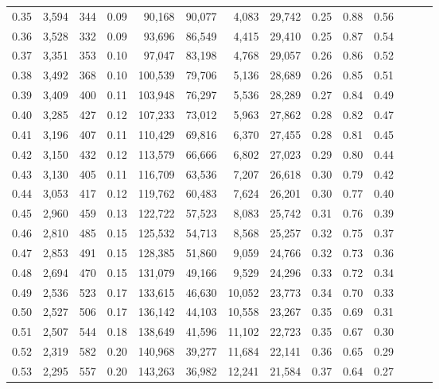 \begin{tabular}{rrrrrrrrrrrrrr}
0.35 &  3,594 &  344 &  0.09 &   90,168 &   90,077 &   4,083 &  29,742 &  0.25 &  0.88 &      0.56 \\
0.36 &  3,528 &  332 &  0.09 &   93,696 &   86,549 &   4,415 &  29,410 &  0.25 &  0.87 &      0.54 \\
0.37 &  3,351 &  353 &  0.10 &   97,047 &   83,198 &   4,768 &  29,057 &  0.26 &  0.86 &      0.52 \\
0.38 &  3,492 &  368 &  0.10 &  100,539 &   79,706 &   5,136 &  28,689 &  0.26 &  0.85 &      0.51 \\
0.39 &  3,409 &  400 &  0.11 &  103,948 &   76,297 &   5,536 &  28,289 &  0.27 &  0.84 &      0.49 \\
0.40 &  3,285 &  427 &  0.12 &  107,233 &   73,012 &   5,963 &  27,862 &  0.28 &  0.82 &      0.47 \\
0.41 &  3,196 &  407 &  0.11 &  110,429 &   69,816 &   6,370 &  27,455 &  0.28 &  0.81 &      0.45 \\
0.42 &  3,150 &  432 &  0.12 &  113,579 &   66,666 &   6,802 &  27,023 &  0.29 &  0.80 &      0.44 \\
0.43 &  3,130 &  405 &  0.11 &  116,709 &   63,536 &   7,207 &  26,618 &  0.30 &  0.79 &      0.42 \\
0.44 &  3,053 &  417 &  0.12 &  119,762 &   60,483 &   7,624 &  26,201 &  0.30 &  0.77 &      0.40 \\
0.45 &  2,960 &  459 &  0.13 &  122,722 &   57,523 &   8,083 &  25,742 &  0.31 &  0.76 &      0.39 \\
0.46 &  2,810 &  485 &  0.15 &  125,532 &   54,713 &   8,568 &  25,257 &  0.32 &  0.75 &      0.37 \\
0.47 &  2,853 &  491 &  0.15 &  128,385 &   51,860 &   9,059 &  24,766 &  0.32 &  0.73 &      0.36 \\
0.48 &  2,694 &  470 &  0.15 &  131,079 &   49,166 &   9,529 &  24,296 &  0.33 &  0.72 &      0.34 \\
0.49 &  2,536 &  523 &  0.17 &  133,615 &   46,630 &  10,052 &  23,773 &  0.34 &  0.70 &      0.33 \\
0.50 &  2,527 &  506 &  0.17 &  136,142 &   44,103 &  10,558 &  23,267 &  0.35 &  0.69 &      0.31 \\
0.51 &  2,507 &  544 &  0.18 &  138,649 &   41,596 &  11,102 &  22,723 &  0.35 &  0.67 &      0.30 \\
0.52 &  2,319 &  582 &  0.20 &  140,968 &   39,277 &  11,684 &  22,141 &  0.36 &  0.65 &      0.29 \\
0.53 &  2,295 &  557 &  0.20 &  143,263 &   36,982 &  12,241 &  21,584 &  0.37 &  0.64 &      0.27 \\

\end{tabular}
